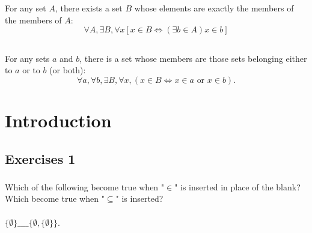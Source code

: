 \documentclass{report}
\begin{document}
For any set $A$, there exists a set $B$ whose elements are exactly the members
  of the members of $A$:
  $$\forall A, \exists B, \forall x
    \left[ x \in B \iff (\exists b \in A) x \in b \right]$$

\begin{axiom}


\end{axiom}

\section{}%
\label{ref:union-axiom-preliminary-form}

For any sets $a$ and $b$, there is a set whose members are those sets belonging
  either to $a$ or to $b$ (or both):
  $$\forall a, \forall b, \exists B, \forall x,
      (x \in B \iff x \in a \text{ or } x \in b).$$

\begin{axiom}


\end{axiom}

\endgroup

\chapter{Introduction}%
\label{chap:introduction}

\section{Exercises 1}%
\label{sec:exercises-1}

\subsection{}%
\label{sub:exercise-1.1}

Which of the following become true when "$\in$" is inserted in place of the
  blank?
Which become true when "$\subseteq$" is inserted?

\subsubsection{}%
\label{ssub:exercise-1.1a}

$\{\emptyset\} \_\_\_\_ \{\emptyset, \{\emptyset\}\}$.
\end{document}
